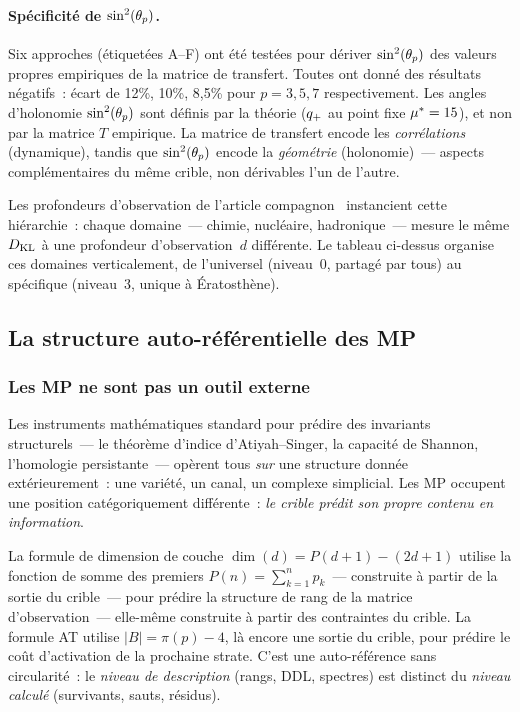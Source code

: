\documentclass[12pt,a4paper]{article}
\begin{document}
\paragraph{Spécificité de $\sin^2(\theta_{p})$.}
Six approches (étiquetées A--F) ont été testées pour dériver
$\sin^2(\theta_{p})$ des valeurs propres empiriques de la matrice de
transfert. Toutes ont donné des résultats négatifs~: écart de 12\%,
10\%, 8{,}5\% pour $p = 3, 5, 7$ respectivement. Les angles
d'holonomie $\sin^2(\theta_{p})$ sont définis par la théorie ($q_{+}$ au
point fixe ${\mu^{*}} = 15$), et non par la matrice $T$ empirique. La
matrice de transfert encode les \emph{corrélations} (dynamique),
tandis que $\sin^2(\theta_{p})$ encode la \emph{géométrie} (holonomie)~---
aspects complémentaires du même crible, non dérivables l'un de
l'autre.

\begin{remarque}
Les profondeurs d'observation de l'article
compagnon~\cite{companion_chemistry} instancient cette hiérarchie~:
chaque domaine~--- chimie, nucléaire, hadronique~--- mesure le même
$D_{\mathrm{KL}}$ à une profondeur d'observation~$d$ différente. Le tableau
ci-dessus organise ces domaines verticalement, de l'universel
(niveau~0, partagé par tous) au spécifique (niveau~3, unique à
Ératosthène).
\end{remarque}


\subsection{La structure auto-référentielle des MP}
\label{sec:PM_self}

\subsubsection{Les MP ne sont pas un outil externe}

Les instruments mathématiques standard pour prédire des invariants
structurels~--- le théorème d'indice d'Atiyah--Singer, la capacité de
Shannon, l'homologie persistante~--- opèrent tous \emph{sur} une
structure donnée extérieurement~: une variété, un canal, un complexe
simplicial. Les MP occupent une position catégoriquement
différente~: \emph{le crible prédit son propre contenu en
information}.

La formule de dimension de couche $\dim(d) = P(d{+}1) - (2d{+}1)$
utilise la fonction de somme des premiers $P(n) = \sum_{k=1}^n p_k$~---
construite à partir de la sortie du crible~--- pour prédire la
structure de rang de la matrice d'observation~--- elle-même construite
à partir des contraintes du crible. La formule AT utilise
$|B| = \pi(p) - 4$, là encore une sortie du crible, pour prédire le
coût d'activation de la prochaine strate. C'est une auto-référence
sans circularité~: le \emph{niveau de description} (rangs, DDL,
spectres) est distinct du \emph{niveau calculé} (survivants, sauts,
résidus).
\end{document}
